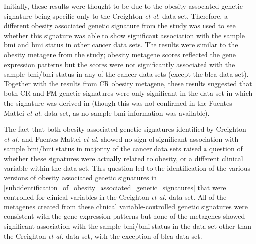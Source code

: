 Initially, these results were thought to be due to the obesity associated genetic signature being specific only to the Creighton \textit{et al.} data set.
Therefore, a different obesity associated genetic signature from the \citet{Fuentes-Mattei2014} study was used to see whether this signature was able to show significant association with the sample \gls{bmi} and \gls{bmi} status in other cancer data sets.
The results were similar to the obesity metagene from the \citet{Creighton2012} study; obesity metagene scores reflected the gene expression patterns but the scores were not significantly associated with the sample \gls{bmi}/\gls{bmi} status in any of the cancer data sets (except the \gls{blca} data set).
Together with the results from CR obesity metagene, these results suggested that both CR and FM genetic signatures were only significant in the data set in which the signature was derived in (though this was not confirmed in the Fuentes-Mattei \textit{et al.} data set, as no sample \gls{bmi} information was available).

The fact that both obesity associated genetic signatures identified by Creighton \textit{et al.} and Fuentes-Mattei \textit{et al.} showed no sign of significant association with sample \gls{bmi}/\gls{bmi} status in majority of the cancer data sets raised a question of whether these signatures were actually related to obesity, or a different clinical variable within the data set.
This question led to the identification of the various versions of obesity associated genetic signatures in \cref{sub:identification_of_obesity_associated_genetic_signatures} that were controlled for clinical variables in the Creighton \textit{et al.} data set.
All of the metagenes created from these clinical variable-controlled genetic signatures were consistent with the gene expression patterns but none of the metagenes showed significant association with the sample \gls{bmi}/\gls{bmi} status in the data set other than the Creighton \textit{et al.} data set, with the exception of \gls{blca} data set.

